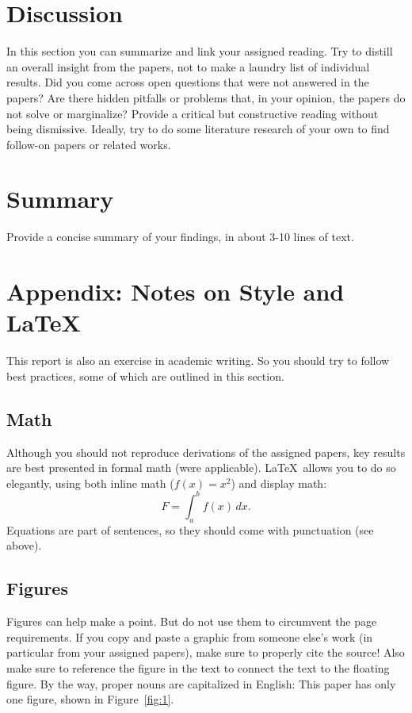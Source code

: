 \documentclass{article}
\begin{document}
\section{Discussion}

In this section you can summarize and link your assigned reading. Try to distill an overall insight from the papers, not to make a laundry list of individual results. Did you come across open questions that were not answered in the papers? Are there hidden pitfalls or problems that, in your opinion, the papers do not solve or marginalize? Provide a critical but constructive reading without being dismissive. Ideally, try to do some literature research of your own to find follow-on papers or related works. 

\section{Summary}

Provide a concise summary of your findings, in about 3-10 lines of text.

\section{Appendix: Notes on Style and \LaTeX}

This report is also an exercise in academic writing. So you should try to follow best practices, some of which are outlined in this section.

\subsection{Math}

Although you should not reproduce derivations of the assigned papers, key results are best presented in formal math (were applicable). \LaTeX~allows you to do so elegantly, using both inline math ($f(x)=x^2$) and display math:
\begin{equation}
  F = \int_a ^b f(x)\,dx.
\end{equation}
Equations are part of sentences, so they should come with punctuation (see above).

\subsection{Figures}

Figures can help make a point. But do not use them to circumvent the page requirements. If you copy and paste a graphic from someone else's work (in particular from your assigned papers), make sure to properly cite the source! Also make sure to reference the figure in the text to connect the text to the floating figure. By the way, proper nouns are capitalized in English: This paper has only one figure, shown in Figure~\ref{fig:1}.
\end{document}
